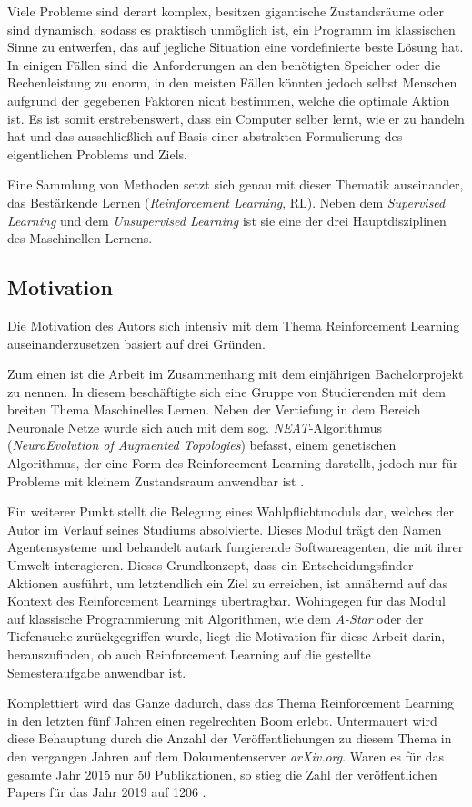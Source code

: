Viele Probleme sind derart komplex, besitzen gigantische Zustandsräume oder sind dynamisch, sodass es praktisch unmöglich ist, ein Programm im klassischen Sinne zu entwerfen, das auf jegliche Situation eine vordefinierte beste Lösung hat. In einigen Fällen sind die Anforderungen an den benötigten Speicher oder die Rechenleistung zu enorm, in den meisten Fällen könnten jedoch selbst Menschen aufgrund der gegebenen Faktoren nicht bestimmen, welche die optimale Aktion ist. Es ist somit erstrebenswert, dass ein Computer selber lernt, wie er zu handeln hat und das ausschließlich auf Basis  einer abstrakten Formulierung des eigentlichen Problems und Ziels. \par 
Eine Sammlung von Methoden setzt sich genau mit dieser Thematik auseinander, das Bestärkende Lernen (\textit{Reinforcement Learning}, RL). Neben dem \textit{Supervised Learning} und dem \textit{Unsupervised Learning} ist sie eine der drei Hauptdisziplinen des Maschinellen Lernens.


\subsection{Motivation}
Die Motivation des Autors sich intensiv mit dem Thema Reinforcement Learning auseinanderzusetzen basiert auf drei Gründen.
\par 
Zum einen ist die Arbeit im Zusammenhang mit dem einjährigen Bachelorprojekt zu nennen. In diesem beschäftigte sich eine Gruppe von Studierenden mit dem breiten Thema \glqq Maschinelles Lernen\grqq{}. Neben der Vertiefung in dem Bereich \glqq Neuronale Netze\grqq{} wurde sich auch mit dem sog. \textit{NEAT}-Algorithmus (\textit{NeuroEvolution of Augmented Topologies}) befasst, einem genetischen Algorithmus, der eine Form des Reinforcement Learning darstellt, jedoch nur für Probleme mit kleinem Zustandsraum anwendbar ist \cite[S.~7f]{Sutton1998}.
\par
Ein weiterer Punkt stellt die Belegung eines Wahlpflichtmoduls dar, welches der Autor im Verlauf seines Studiums absolvierte. Dieses Modul trägt den Namen \glqq Agentensysteme\grqq{} und behandelt autark fungierende Softwareagenten, die mit ihrer Umwelt interagieren. Dieses Grundkonzept, dass ein Entscheidungsfinder Aktionen ausführt, um letztendlich ein Ziel zu erreichen, ist annähernd auf das Kontext des Reinforcement Learnings übertragbar. Wohingegen für das Modul auf \glqq klassische\grqq{} Programmierung mit Algorithmen, wie dem \textit{A-Star} oder der Tiefensuche zurückgegriffen wurde, liegt die Motivation für diese Arbeit darin, herauszufinden, ob auch Reinforcement Learning auf die gestellte Semesteraufgabe anwendbar ist.
\par
Komplettiert wird das Ganze dadurch, dass das Thema Reinforcement Learning in den letzten fünf Jahren einen regelrechten Boom erlebt. Untermauert wird diese Behauptung durch die Anzahl der Veröffentlichungen zu diesem Thema in den vergangen Jahren auf dem Dokumentenserver \textit{arXiv.org}. Waren es für das gesamte Jahr 2015 nur 50 Publikationen, so stieg die Zahl der veröffentlichen Papers für das Jahr 2019 auf 1206 \cite[]{arxiv}.



